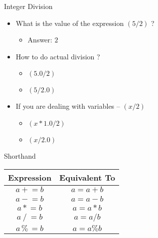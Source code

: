\begin{frame}[fragile]{Integer Division}{}
    \begin{itemize}
        \item What is the value of the expression $(5/2)$ ?
    \pause
        \begin{itemize}
            \item Answer: $2$
        \end{itemize}
    \pause
        \item How to do actual division ?
        \begin{itemize}
            \item $(5.0/2)$
            \item $(5/2.0)$
        \end{itemize}
    \pause
        \item If you are dealing with variables -- $(x/2)$
        \begin{itemize}
            \item $(x*1.0/2)$
            \item $(x/2.0)$
        \end{itemize}
    \end{itemize}
\end{frame}

\begin{frame}[fragile]{Shorthand}{}
    \Large
    \begin{table}[]
    \centering
    \begin{tabular}{cc}
    \hline
    \textbf{Expression} & \textbf{Equivalent To} \\ \hline
    $a \mathrel+= b $          & $a = a + b $        \\ \hline
    $a \mathrel-= b $          & $a = a - b $        \\ \hline
    $a \mathrel*= b $          & $a = a * b $        \\ \hline
    $a \mathrel/= b $          & $a = a / b $        \\ \hline
    $a \mathrel\%= b$          & $a = a \% b$        \\ \hline
    \end{tabular}
    \end{table}
\end{frame}
